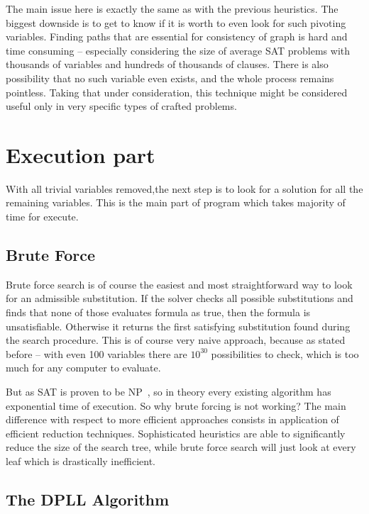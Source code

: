 \documentclass[12pt,english,pdflatex]{aghdpl}
\begin{document}
The main issue here is exactly the same as with the previous heuristics. The
biggest downside is to get to know if it is worth to even look for
such pivoting variables. Finding paths that are essential for consistency
of graph is hard and time consuming -- especially considering the size
of average SAT problems with thousands of variables and hundreds of
thousands of clauses. There is also possibility that no such variable
even exists, and the whole process remains pointless. Taking that
under consideration, this technique might be considered useful only
in very specific types of crafted problems.

\section{Execution part}
\label{sec:Execution}

With all trivial variables removed,the  next step is to look for a solution
for all the remaining variables. This is the main part of program which takes
majority of time for  execute.

\subsection{Brute Force}
\label{subsec:Brute}

Brute force search is of course the easiest and most straightforward way to look for an admissible
substitution. If the solver checks all possible substitutions and finds
that none of those evaluates formula as true, then the formula is unsatisfiable.
Otherwise it returns the  first  satisfying substitution found during the search procedure. This is
of course very naive approach, because as stated before -- with even
100 variables there are $10^{30}$ possibilities to check, 
which is  too much for any computer to evaluate.

But as SAT is proven to be NP~\cite{Cook:1971}, so in theory every existing algorithm has
exponential time of execution. So why brute forcing is not working? The main difference with respect to more efficient approaches consists in application of efficient reduction techniques.
 Sophisticated heuristics are able to significantly reduce the size of the search
tree, while brute force search will just look at every leaf which is drastically inefficient.

\subsection{The DPLL Algorithm}
\label{subsec:DPLL}
\end{document}
